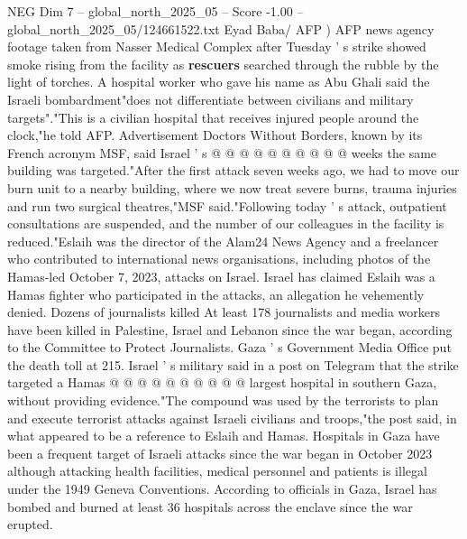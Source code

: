 \begin{textsample}{NEG Dim 7 – global\_north\_2025\_05 – Score -1.00 – global\_north\_2025\_05/124661522.txt}
Eyad Baba/ AFP ) AFP news agency footage taken from Nasser Medical Complex after Tuesday ' s strike showed smoke rising from the facility as \textbf{rescuers} searched through the rubble by the light of torches.
A hospital worker who gave his name as Abu Ghali said the Israeli bombardment"does not differentiate between civilians and military targets"."This is a civilian hospital that receives injured people around the clock,"he told AFP.
Advertisement Doctors Without Borders, known by its French acronym MSF, said Israel ' s @ @ @ @ @ @ @ @ @ @ weeks the same building was targeted."After the first attack seven weeks ago, we had to move our burn unit to a nearby building, where we now treat severe burns, trauma injuries and run two surgical theatres,"MSF said."Following today ' s attack, outpatient consultations are suspended, and the number of our colleagues in the facility is reduced."Eslaih was the director of the Alam24 News Agency and a freelancer who contributed to international news organisations, including photos of the Hamas-led October 7, 2023, attacks on Israel.
Israel has claimed Eslaih was a Hamas fighter who participated in the attacks, an allegation he vehemently denied.
Dozens of journalists killed At least 178 journalists and media workers have been killed in Palestine, Israel and Lebanon since the war began, according to the Committee to Protect Journalists.
Gaza ' s Government Media Office put the death toll at 215.
Israel ' s military said in a post on Telegram that the strike targeted a Hamas @ @ @ @ @ @ @ @ @ @ largest hospital in southern Gaza, without providing evidence."The compound was used by the terrorists to plan and execute terrorist attacks against Israeli civilians and troops,"the post said, in what appeared to be a reference to Eslaih and Hamas.
Hospitals in Gaza have been a frequent target of Israeli attacks since the war began in October 2023 although attacking health facilities, medical personnel and patients is illegal under the 1949 Geneva Conventions.
According to officials in Gaza, Israel has bombed and burned at least 36 hospitals across the enclave since the war erupted.

\end{textsample}
